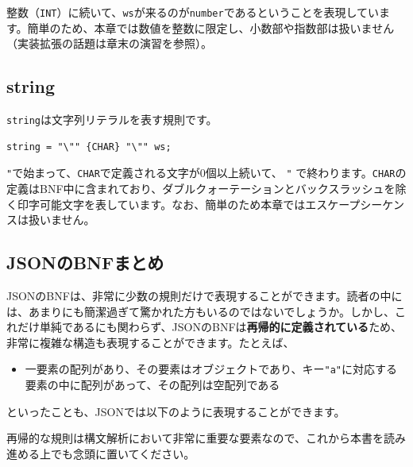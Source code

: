 整数（\texttt{INT}）に続いて、\texttt{ws}が来るのが\texttt{number}であるということを表現しています。簡単のため、本章では数値を整数に限定し、小数部や指数部は扱いません（実装拡張の話題は章末の演習を参照）。

\hypertarget{chapter3-string}{%
\subsection{string}\label{chapter3-string}}

\texttt{string}は文字列リテラルを表す規則です。

\begin{verbatim}
string = "\"" {CHAR} "\"" ws;
\end{verbatim}

\texttt{"}で始まって、\texttt{CHAR}で定義される文字が0個以上続いて、
\texttt{"}
で終わります。\texttt{CHAR}の定義はBNF中に含まれており、ダブルクォーテーションとバックスラッシュを除く印字可能文字を表しています。なお、簡単のため本章ではエスケープシーケンスは扱いません。

\hypertarget{chapter3-jsonux306ebnfux307eux3068ux3081}{%
\subsection{JSONのBNFまとめ}\label{chapter3-jsonux306ebnfux307eux3068ux3081}}

JSONのBNFは、非常に少数の規則だけで表現することができます。読者の中には、あまりにも簡潔過ぎて驚かれた方もいるのではないでしょうか。しかし、これだけ単純であるにも関わらず、JSONのBNFは\textbf{再帰的に定義されている}ため、非常に複雑な構造も表現することができます。たとえば、

\begin{itemize}
\tightlist
\item
  一要素の配列があり、その要素はオブジェクトであり、キー\texttt{"a"}に対応する要素の中に配列があって、その配列は空配列である
\end{itemize}

といったことも、JSONでは以下のように表現することができます。

\begin{Shaded}
\begin{Highlighting}[]
\OtherTok{[}\FunctionTok{\{}\FunctionTok{:}\OtherTok{[]}\FunctionTok{\}}\OtherTok{]}
\end{Highlighting}
\end{Shaded}

再帰的な規則は構文解析において非常に重要な要素なので、これから本書を読み進める上でも念頭に置いてください。

